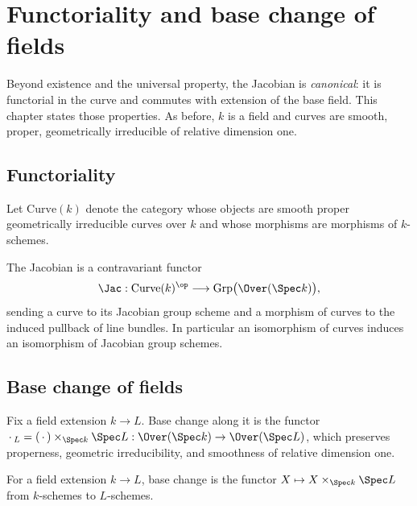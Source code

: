 \chapter{Functoriality and base change of fields}
\label{chap:BaseChange}

Beyond existence and the universal property, the Jacobian is \emph{canonical}: it is functorial in
the curve and commutes with extension of the base field. This chapter states those properties. As
before, \(k\) is a field and curves are smooth, proper, geometrically irreducible of relative
dimension one.

\section{Functoriality}

\begin{definition}
  \label{def:Curve}
  Let \(\mathrm{Curve}(k)\) denote the category whose objects are smooth proper geometrically
  irreducible curves over \(k\) and whose morphisms are morphisms of \(k\)-schemes.
\end{definition}

\begin{definition}
  \label{def:jacobian_functor}
  The Jacobian is a contravariant functor
  \[
    \Jac : \mathrm{Curve}(k)^{\op} \longrightarrow \mathrm{Grp}\bigl(\Over(\Spec k)\bigr),
  \]
  sending a curve to its Jacobian group scheme and a morphism of curves to the induced pullback of
  line bundles. In particular an isomorphism of curves induces an isomorphism of Jacobian group
  schemes.
\end{definition}

\section{Base change of fields}

Fix a field extension \(k \to L\). Base change along it is the functor
\(\,\cdot\,_L = (\,\cdot\,) \times_{\Spec k} \Spec L : \Over(\Spec k) \to \Over(\Spec L)\), which
preserves properness, geometric irreducibility, and smoothness of relative dimension one.

\begin{definition}
  \label{def:baseChange}
  \leanok
  For a field extension \(k \to L\), base change is the functor
  \(X \mapsto X \times_{\Spec k} \Spec L\) from \(k\)-schemes to \(L\)-schemes.
\end{definition}

